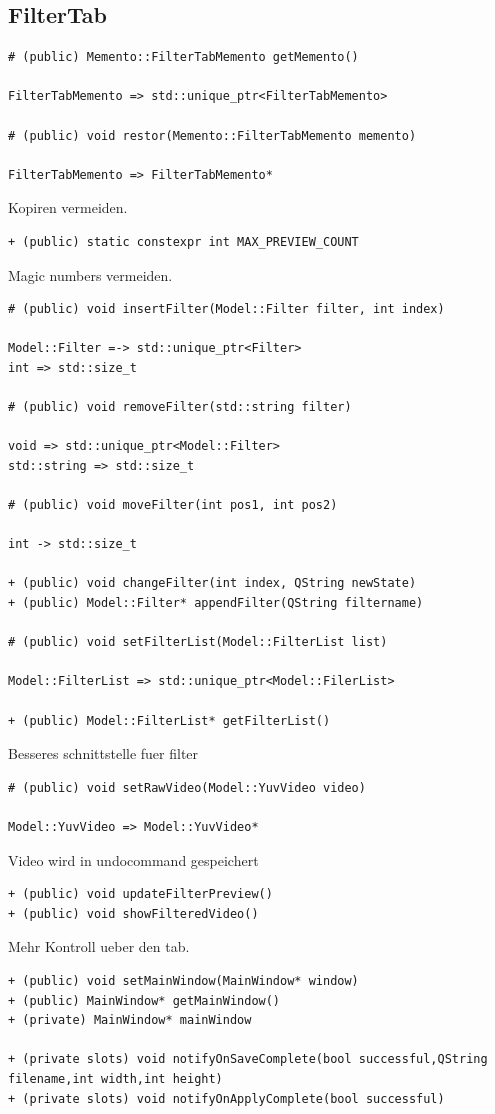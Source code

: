 \documentclass[parskip=full]{scrartcl}
\begin{document}
\subsection{FilterTab}
\begin{verbatim}
# (public) Memento::FilterTabMemento getMemento()

FilterTabMemento => std::unique_ptr<FilterTabMemento>

# (public) void restor(Memento::FilterTabMemento memento)

FilterTabMemento => FilterTabMemento*
\end{verbatim}
Kopiren vermeiden.
\begin{verbatim}
+ (public) static constexpr int MAX_PREVIEW_COUNT
\end{verbatim}
Magic numbers vermeiden.

\begin{verbatim}
# (public) void insertFilter(Model::Filter filter, int index)

Model::Filter =-> std::unique_ptr<Filter>
int => std::size_t

# (public) void removeFilter(std::string filter)

void => std::unique_ptr<Model::Filter>
std::string => std::size_t

# (public) void moveFilter(int pos1, int pos2)

int -> std::size_t

+ (public) void changeFilter(int index, QString newState)
+ (public) Model::Filter* appendFilter(QString filtername)

# (public) void setFilterList(Model::FilterList list)

Model::FilterList => std::unique_ptr<Model::FilerList>

+ (public) Model::FilterList* getFilterList()
\end{verbatim}
Besseres schnittstelle fuer filter
\begin{verbatim}
# (public) void setRawVideo(Model::YuvVideo video)

Model::YuvVideo => Model::YuvVideo*
\end{verbatim}
Video wird in undocommand gespeichert
\begin{verbatim}
+ (public) void updateFilterPreview()
+ (public) void showFilteredVideo()
\end{verbatim}
Mehr Kontroll ueber den tab.
\begin{verbatim}
+ (public) void setMainWindow(MainWindow* window)
+ (public) MainWindow* getMainWindow()
+ (private) MainWindow* mainWindow

+ (private slots) void notifyOnSaveComplete(bool successful,QString filename,int width,int height)
+ (private slots) void notifyOnApplyComplete(bool successful)
\end{verbatim}
\end{document}
